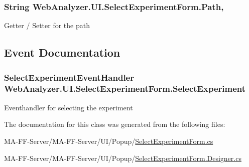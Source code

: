 \subsubsection[{Path}]{\setlength{\rightskip}{0pt plus 5cm}String Web\+Analyzer.\+U\+I.\+Select\+Experiment\+Form.\+Path\hspace{0.3cm}{\ttfamily [get]}, {\ttfamily [set]}}\label{class_web_analyzer_1_1_u_i_1_1_select_experiment_form_ad5b8d4def72474dd55f8d244955bae36}


Getter / Setter for the path 



\subsection{Event Documentation}
\hypertarget{class_web_analyzer_1_1_u_i_1_1_select_experiment_form_a1e364e5b7061777bab04e7b255eff656}{}
\subsubsection[{Select\+Experiment}]{\setlength{\rightskip}{0pt plus 5cm}Select\+Experiment\+Event\+Handler Web\+Analyzer.\+U\+I.\+Select\+Experiment\+Form.\+Select\+Experiment}\label{class_web_analyzer_1_1_u_i_1_1_select_experiment_form_a1e364e5b7061777bab04e7b255eff656}


Eventhandler for selecting the experiment 



The documentation for this class was generated from the following files\+:\begin{DoxyCompactItemize}
\item 
M\+A-\/\+F\+F-\/\+Server/\+M\+A-\/\+F\+F-\/\+Server/\+U\+I/\+Popup/\hyperlink{_select_experiment_form_8cs}{Select\+Experiment\+Form.\+cs}\item 
M\+A-\/\+F\+F-\/\+Server/\+M\+A-\/\+F\+F-\/\+Server/\+U\+I/\+Popup/\hyperlink{_select_experiment_form_8_designer_8cs}{Select\+Experiment\+Form.\+Designer.\+cs}\end{DoxyCompactItemize}
